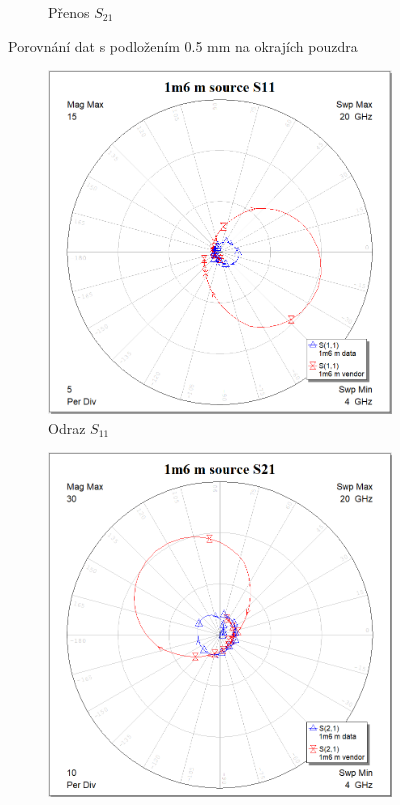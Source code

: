 \documentclass[11pt,a4paper]{article}
\begin{document}
\begin{figure}[!ht]
\begin{subfigure}{0.45\textwidth}
    \caption{Přenos $S_{21}$}
\end{subfigure}
\caption{\label{fig:0m5m}Porovnání dat s podložením 0.5 mm na okrajích pouzdra}
\end{figure}
\begin{figure}[!ht]
    \centering
\begin{subfigure}{0.45\textwidth}
    \centering
    \includegraphics[width=\textwidth]{src/1m6m-S11.png}
    \caption{Odraz $S_{11}$}
\end{subfigure}
\begin{subfigure}{0.45\textwidth}
    \centering
    \includegraphics[width=\textwidth]{src/1m6m-S21.png}

\end{subfigure}
\end{figure}
\end{document}
